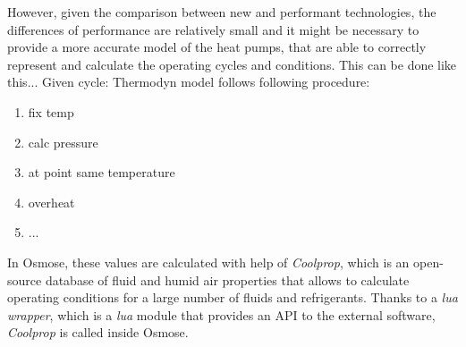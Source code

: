 \documentclass{article}
\begin{document}
However, given the comparison between new and performant technologies, the differences of performance are relatively small and it might be necessary to provide a more accurate model of the heat pumps, that are able to correctly represent and calculate the operating cycles and conditions. This can be done like this...
Given cycle:
Thermodyn model follows following procedure:
\begin{enumerate}
    \item fix temp
    \item calc pressure
    \item at point same temperature
    \item overheat
    \item ...
\end{enumerate}

In Osmose, these values are calculated with help of \textit{Coolprop}, which is an open-source database of fluid and humid air properties that allows to calculate operating conditions for a large number of fluids and refrigerants. Thanks to a \textit{lua wrapper}, which is a \textit{lua} module that provides an API to the external software, \textit{Coolprop} is called inside Osmose.
\end{document}
